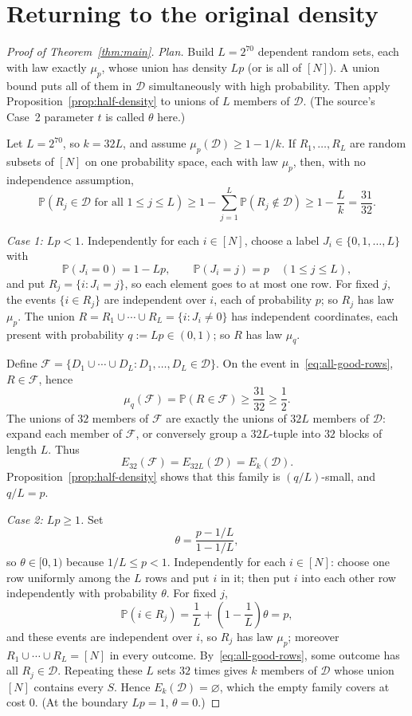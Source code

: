 \documentclass[11pt,letterpaper]{article}
\theoremstyle{definition}
\theoremstyle{remark}
\numberwithin{equation}{section}
\begin{document}
\section{Returning to the original density}
\label{sec:density}

\begin{proof}[Proof of Theorem~\ref{thm:main}]
\emph{Plan.} Build $L=2^{70}$ dependent random sets, each with law
exactly $\mu_p$, whose union has density $Lp$ (or is all of $[N]$). A
union bound puts all of them in $\mathcal D$ simultaneously with high
probability. Then apply Proposition~\ref{prop:half-density} to unions of
$L$ members of $\mathcal D$. (The source's Case~2 parameter $t$ is
called $\theta$ here.)

Let $L=2^{70}$, so $k=32L$, and assume $\mu_p(\mathcal D)\ge1-1/k$. If
$R_1,\ldots,R_L$ are random subsets of $[N]$ on one probability space,
each with law $\mu_p$, then, with no independence assumption,
\begin{equation}
\label{eq:all-good-rows}
\mathbb P(R_j\in\mathcal D\text{ for all }1\le j\le L)
\ge1-\sum_{j=1}^L\mathbb P(R_j\notin\mathcal D)
\ge1-\frac Lk=\frac{31}{32}.
\end{equation}

\medskip
\noindent\emph{Case 1: $Lp<1$.}
Independently for each $i\in[N]$, choose a label
$J_i\in\{0,1,\ldots,L\}$ with
\[
\mathbb P(J_i=0)=1-Lp,
\qquad
\mathbb P(J_i=j)=p\quad(1\le j\le L),
\]
and put $R_j=\{i:J_i=j\}$, so each element goes to at most one row. For
fixed $j$, the events $\{i\in R_j\}$ are independent over $i$, each of
probability $p$; so $R_j$ has law $\mu_p$. The union
$R=R_1\cup\cdots\cup R_L=\{i:J_i\ne0\}$ has independent coordinates,
each present with probability $q:=Lp\in(0,1)$; so $R$ has law $\mu_q$.

Define
$\mathcal F=\{D_1\cup\cdots\cup D_L:D_1,\ldots,D_L\in\mathcal D\}$.
On the event in~\eqref{eq:all-good-rows}, $R\in\mathcal F$, hence
\[
\mu_q(\mathcal F)=\mathbb P(R\in\mathcal F)\ge\frac{31}{32}\ge\frac12.
\]
The unions of $32$ members of $\mathcal F$ are exactly the unions of
$32L$ members of $\mathcal D$: expand each member of $\mathcal F$, or
conversely group a $32L$-tuple into $32$ blocks of length $L$. Thus
\[
E_{32}(\mathcal F)=E_{32L}(\mathcal D)=E_k(\mathcal D).
\]
Proposition~\ref{prop:half-density} shows that this family is
$(q/L)$-small, and $q/L=p$.

\medskip
\noindent\emph{Case 2: $Lp\ge1$.}
Set
\[
\theta=\frac{p-1/L}{1-1/L},
\]
so $\theta\in[0,1)$ because $1/L\le p<1$. Independently for each
$i\in[N]$: choose one row uniformly among the $L$ rows and put $i$ in
it; then put $i$ into each other row independently with probability
$\theta$. For fixed $j$,
\[
\mathbb P(i\in R_j)=\frac1L+\left(1-\frac1L\right)\theta=p,
\]
and these events are independent over $i$, so $R_j$ has law $\mu_p$;
moreover $R_1\cup\cdots\cup R_L=[N]$ in every outcome.
By~\eqref{eq:all-good-rows}, some outcome has all $R_j\in\mathcal D$.
Repeating these $L$ sets $32$ times gives $k$ members of $\mathcal D$
whose union $[N]$ contains every $S$. Hence $E_k(\mathcal D)=\varnothing$,
which the empty family covers at cost $0$. (At the boundary $Lp=1$,
$\theta=0$.)
\end{proof}
\end{document}
